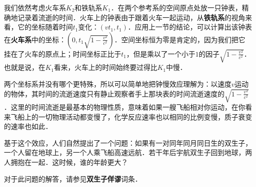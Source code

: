 我们依然考虑火车系$K_2$和铁轨系$K_1$．在两个参考系的空间原点处放一只钟表，精确地记录着流逝的时间．火车上的钟表由于跟着火车一起运动，从\textbf{铁轨系}的视角来看，它的坐标随着时间$t_1$变化：$(vt_1, t_1)$．应用上一节的结论，可以计算出该钟表在\textbf{火车系}中的坐标：$(0, t_1\sqrt{1-\frac{v^2}{c^2}})$．空间坐标恒为零是肯定的，因为我们把它挂在了火车的原点上；时间坐标正比于$t_1$，但是乘以了一个小于$1$的因子$\sqrt{1-\frac{v^2}{c^2}}$．也就是说，在$K_1$看来，火车上的时间始终要过得比$K_1$中慢．

两个坐标系并没有哪个更特殊，所以可以简单地把钟慢效应理解为：以速度$v$运动的物体，其时间的流逝速度只有静止观察者手上那块表的时间流逝速度的$\sqrt{1-\frac{v^2}{c^2}}$．这里的时间流逝是最基本的物理性质，意味着如果一艘飞船相对你运动，在你看来飞船上的一切物理活动都变慢了，化学反应速率也以相同的比例变慢，质子衰变的速率也如此．

基于这个效应，人们自然提出了一个问题：如果有一对同年同月同日生的双生子，一个人留在地球上，另一个人乘飞船高速远航．若干年后宇航双生子回到地球，两人拥抱在一起．这时候，谁的年龄更大？

对于此问题的解答，请参见\textbf{双生子佯谬}词条．
